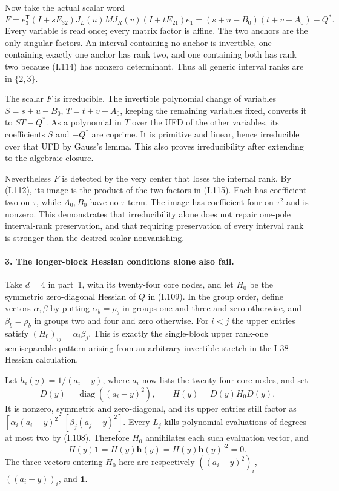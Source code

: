 Now take the actual scalar word
\[
 F=e_3^{\mathsf T}(I+sE_{32})J_L(u)M J_R(v)
                      (I+tE_{21})e_1
   =(s+u-B_0)(t+v-A_0)-Q^*.
 \tag{I.115}
\]
Every variable is read once; every matrix factor is affine.
The two anchors are the only singular factors. An interval
containing no anchor is invertible, one containing exactly one
anchor has rank two, and one containing both has rank two
because (I.114) has nonzero determinant. Thus all generic
interval ranks are in $\{2,3\}$.

The scalar $F$ is irreducible. The invertible polynomial change
of variables $S=s+u-B_0$, $T=t+v-A_0$, keeping the remaining
variables fixed, converts it to $ST-Q^*$. As a polynomial in
$T$ over the UFD of the other variables, its coefficients $S$
and $-Q^*$ are coprime. It is primitive and linear, hence
irreducible over that UFD by Gauss's lemma. This also proves
irreducibility after extending to the algebraic closure.

Nevertheless $F$ is detected by the very center that loses
the internal rank. By (I.112), its image is the product of
the two factors in (I.115). Each has coefficient two on
$\tau$, while $A_0,B_0$ have no $\tau$ term. The image has
coefficient four on $\tau^2$ and is nonzero. This demonstrates
that irreducibility alone does not repair one-pole interval-rank
preservation, and that requiring preservation of every interval
rank is stronger than the desired scalar nonvanishing.

\paragraph{3. The longer-block Hessian conditions alone also fail.}
Take $d=4$ in part~1, with its twenty-four core nodes, and let
$H_0$ be the symmetric zero-diagonal Hessian of $Q$ in (I.109).
In the group order, define vectors $\alpha,\beta$ by putting
$\alpha_b=\rho_b$ in groups one and three and zero otherwise,
and $\beta_b=\rho_b$ in groups two and four and zero otherwise.
For $i<j$ the upper entries satisfy
$(H_0)_{ij}=\alpha_i\beta_j$. This is exactly the single-block
upper rank-one semiseparable pattern arising from an arbitrary
invertible stretch in the I-38 Hessian calculation.

Let $h_i(y)=1/(a_i-y)$, where $a_i$ now lists the twenty-four
core nodes, and set
\[
 D(y)=\operatorname{diag}((a_i-y)^2),\qquad
 H(y)=D(y)H_0D(y).
 \tag{I.116}
\]
It is nonzero, symmetric and zero-diagonal, and its upper
entries still factor as
$[\alpha_i(a_i-y)^2][\beta_j(a_j-y)^2]$.
Every $L_j$ kills polynomial evaluations of degrees at most
two by (I.108). Therefore $H_0$ annihilates each such evaluation
vector, and
\[
 H(y)\mathbf1=H(y)\mathbf h(y)
              =H(y)\mathbf h(y)^{\circ2}=0.
 \tag{I.117}
\]
The three vectors entering $H_0$ here are respectively
$((a_i-y)^2)_i$, $((a_i-y))_i$, and $\mathbf1$.

